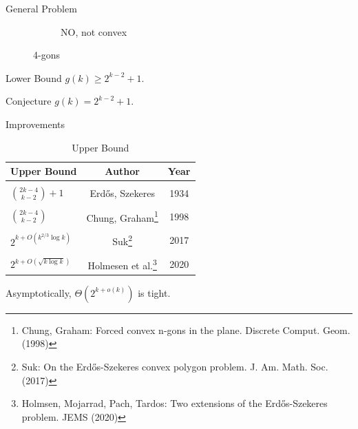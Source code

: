 \documentclass{beamer}
\begin{document}
\begin{frame}{General Problem}
{\begin{figure}
\begin{subfigure}[t]{0.3\textwidth}
				\caption{NO, not convex}
				\label{fignot4gon}
			\end{subfigure}
			\caption{4-gons}
			\label{figgons}
		\end{figure}

	}
	 {
		\begin{block}{Lower Bound}
			$g(k) \ge 2^{k-2} + 1$.
		\end{block}

		\begin{alertblock}{Conjecture}
			$g(k) = 2^{k-2} + 1$.
		\end{alertblock}
	}

\end{frame}

\begin{frame}{Improvements}

	\begin{table}
		\begin{tabular}{l | c | c }
			Upper Bound                  & Author                                                                                                                   & Year \\
			\hline \hline
			\\
			$\binom{2k-4}{k-2} + 1$      & Erd\H{o}s, Szekeres                                                                                                      & 1934 \\
			\\
			$\binom{2k-4}{k-2}$          & Chung, Graham\footnote{Chung, Graham: Forced convex n-gons in the plane. Discrete Comput. Geom. (1998)}                  & 1998 \\
			\\
			$2^{k + O(k ^{2/3} \log k)}$ & Suk\footnote{Suk: On the Erd\H{o}s-Szekeres convex polygon problem. J. Am. Math. Soc. (2017)}                            & 2017 \\
			\\
			$2^{k + O(\sqrt{k \log k})}$ & Holmesen et al.\footnote{Holmsen, Mojarrad, Pach, Tardos: Two extensions of the Erd\H{o}s-Szekeres problem. JEMS (2020)} & 2020
		\end{tabular}
		\caption{Upper Bound}
	\end{table}

	Asymptotically, $\Theta(2^{k+o(k)})$ is tight.

\end{frame}
\end{document}
